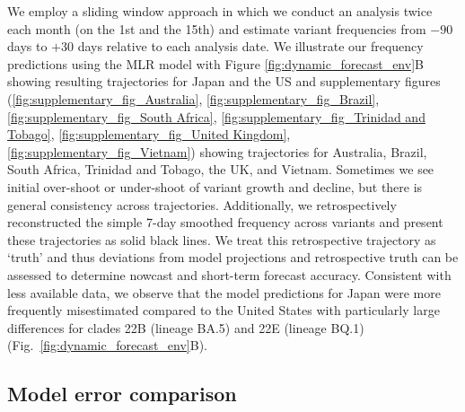 \documentclass[11pt,oneside,letterpaper]{article}
\begin{document}
We employ a sliding window approach in which we conduct an analysis twice each month (on the 1st and the 15th) and estimate variant frequencies from $-90$ days to $+30$ days relative to each analysis date.
We illustrate our frequency predictions using the MLR model with Figure \ref{fig:dynamic_forecast_env}B showing resulting trajectories for Japan and the US and supplementary figures (\ref{fig:supplementary_fig_Australia}, \ref{fig:supplementary_fig_Brazil}, \ref{fig:supplementary_fig_South Africa}, \ref{fig:supplementary_fig_Trinidad and Tobago}, \ref{fig:supplementary_fig_United Kingdom}, \ref{fig:supplementary_fig_Vietnam}) showing trajectories for Australia, Brazil, South Africa, Trinidad and Tobago, the UK, and Vietnam.
Sometimes we see initial over-shoot or under-shoot of variant growth and decline, but there is general consistency across trajectories.
Additionally, we retrospectively reconstructed the simple 7-day smoothed frequency across variants and present these trajectories as solid black lines.
We treat this retrospective trajectory as `truth' and thus deviations from model projections and retrospective truth can be assessed to determine nowcast and short-term forecast accuracy.
Consistent with less available data, we observe that the model predictions for Japan were more frequently misestimated compared to the United States with particularly large differences for clades 22B (lineage BA.5) and 22E (lineage BQ.1) (Fig.~\ref{fig:dynamic_forecast_env}B).

\subsection*{Model error comparison}
\end{document}
